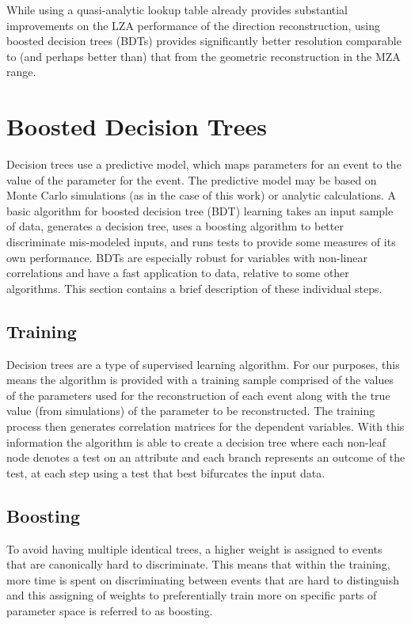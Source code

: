 \documentclass[main.tex]{subfiles}
\begin{document}
While using a quasi-analytic lookup table already provides substantial improvements on the LZA performance of the direction reconstruction, using boosted decision trees (BDTs) provides significantly better resolution comparable to (and perhaps better than) that from the geometric reconstruction in the MZA range.

\section{Boosted Decision Trees}
Decision trees use a predictive model, which maps parameters for an event to the value of the \disp parameter for the event. The predictive model may be based on Monte Carlo simulations (as in the case of this work) or analytic calculations. A basic algorithm for boosted decision tree (BDT) learning takes an input sample of data, generates a decision tree, uses a boosting algorithm to better discriminate mis-modeled inputs, and runs tests to provide some measures of its own performance. BDTs are especially robust for variables with non-linear correlations and have a fast application to data, relative to some other algorithms. This section contains a brief description of these individual steps.

\subsection{Training}
Decision trees are a type of supervised learning algorithm. For our purposes, this means the algorithm is provided with a training sample comprised of the values of the parameters used for the reconstruction of each event along with the true value (from simulations) of the parameter to be reconstructed. The training process then generates correlation matrices for the dependent variables. With this information the algorithm is able to create a decision tree where each non-leaf node denotes a test on an attribute and each branch represents an outcome of the test, at each step using a test that best bifurcates the input data.

\subsection{Boosting}
To avoid having multiple identical trees, a higher weight is assigned to events that are canonically hard to discriminate. This means that within the training, more time is spent on discriminating between events that are hard to distinguish and this assigning of weights to preferentially train more on specific parts of parameter space is referred to as boosting.
\end{document}
